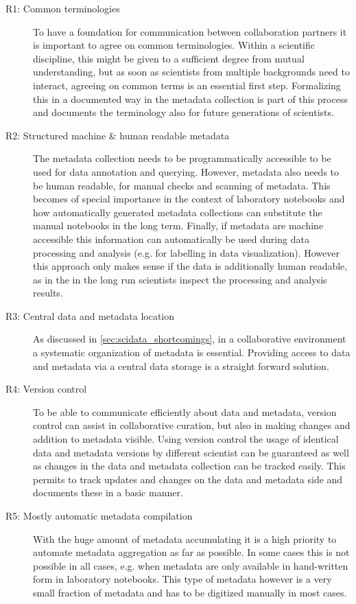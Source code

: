 \begin{description}
 \item[R1: Common terminologies] To have a foundation for communication between collaboration partners it is important to agree on common terminologies. Within a scientific discipline, this might be given to a sufficient degree from mutual understanding, but as soon as scientists from multiple backgrounds need to interact, agreeing on common terms is an essential first step. Formalizing this in a documented way in the metadata collection is part of this process and documents the terminology also for future generations of scientists.
 \item[R2: Structured machine \& human readable metadata] The metadata collection needs to be programmatically accessible to be used for data annotation and querying. However, metadata also needs to be human readable, for manual checks and scanning of metadata. This becomes of special importance in the context of laboratory notebooks and how automatically generated metadata collections can substitute the manual notebooks in the long term. Finally, if metadata are machine accessible this information can automatically be used during data processing and analysis (e.g. for labelling in data visualization). However this approach only makes sense if the data is additionally human readable, as in the in the long run scientists inspect the processing and analysis results.
 \item[R3: Central data and metadata location] As discussed in \cref{sec:scidata_shortcomings}, in a collaborative environment a systematic organization of metadata is essential. Providing access to data and metadata via a central data storage is a straight forward solution. 
 \item[R4: Version control] To be able to communicate efficiently about data and metadata, version control can assist in collaborative curation, but also in making changes and addition to metadata visible. Using version control the usage of identical data and metadata versions by different scientist can be guaranteed as well as changes in the data and metadata collection can be tracked easily. This permits to track updates and changes on the data and metadata side and documents these in a basic manner.
 \item[R5: Mostly automatic metadata compilation] With the huge amount of metadata accumulating it is a high priority to automate metadata aggregation as far as possible. In some cases this is not possible in all cases, e.g. when metadata are only available in hand-written form in laboratory notebooks. This type of metadata however is a very small fraction of metadata and has to be digitized manually in most cases.

\end{description}
